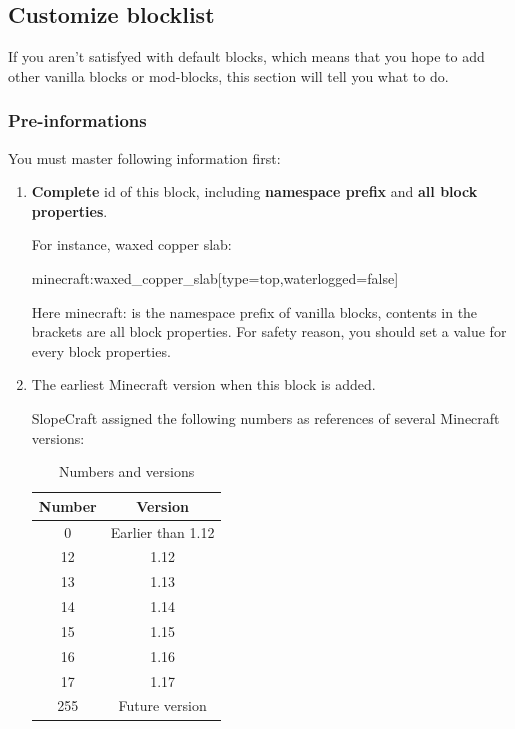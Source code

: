 \documentclass{article}
\begin{document}
   \subsection{Customize blocklist}
   If you aren't satisfyed with default blocks, which means that you hope to add other vanilla blocks or mod-blocks, this section will tell you what to do.
   
   \subsubsection{Pre-informations}
   You must master following information first:

   \begin{enumerate}
       \item \textbf{Complete} id of this block, including \textbf{namespace prefix} and \textbf{all block properties}.
       
       For instance, waxed copper slab:
       
       minecraft:waxed\_copper\_slab[type=top,waterlogged=false]

       Here minecraft: is the namespace prefix of vanilla blocks, contents in the brackets are all block properties. For safety reason, you should set a value for every block properties.

       \item The earliest Minecraft version when this block is added.

       SlopeCraft assigned the following numbers as references of several Minecraft versions:
       \begin{table}[h]
        \centering
        \caption{Numbers and versions}
        \label{VerAndRealVer}
        \begin{tabular}{cc}\hline
            Number & Version \\ \hline
            0 & Earlier than 1.12 \\
            12 & 1.12 \\
            13 & 1.13 \\
            14 & 1.14 \\
            15 & 1.15 \\
            16 & 1.16 \\
            17 & 1.17 \\
            255 & Future version \\
            \hline            
        \end{tabular}
       \end{table}


\end{enumerate}
\end{document}
